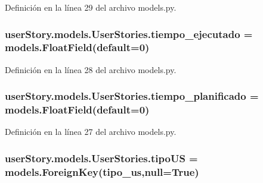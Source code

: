 Definición en la línea 29 del archivo models.\+py.

\subsubsection[{\texorpdfstring{tiempo\+\_\+ejecutado}{tiempo_ejecutado}}]{\setlength{\rightskip}{0pt plus 5cm}user\+Story.\+models.\+User\+Stories.\+tiempo\+\_\+ejecutado = models.\+Float\+Field(default=0)\hspace{0.3cm}{\ttfamily [static]}}\hypertarget{classuser_story_1_1models_1_1_user_stories_add4c9402f48f9d57b0786e27e4df58ea}{}\label{classuser_story_1_1models_1_1_user_stories_add4c9402f48f9d57b0786e27e4df58ea}


Definición en la línea 28 del archivo models.\+py.

\subsubsection[{\texorpdfstring{tiempo\+\_\+planificado}{tiempo_planificado}}]{\setlength{\rightskip}{0pt plus 5cm}user\+Story.\+models.\+User\+Stories.\+tiempo\+\_\+planificado = models.\+Float\+Field(default=0)\hspace{0.3cm}{\ttfamily [static]}}\hypertarget{classuser_story_1_1models_1_1_user_stories_a59c31c96525fb97a99df3c82ccefec49}{}\label{classuser_story_1_1models_1_1_user_stories_a59c31c96525fb97a99df3c82ccefec49}


Definición en la línea 27 del archivo models.\+py.

\subsubsection[{\texorpdfstring{tipo\+US}{tipoUS}}]{\setlength{\rightskip}{0pt plus 5cm}user\+Story.\+models.\+User\+Stories.\+tipo\+US = models.\+Foreign\+Key({\bf tipo\+\_\+us},null=True)\hspace{0.3cm}{\ttfamily [static]}}\hypertarget{classuser_story_1_1models_1_1_user_stories_aef9db53ba498c5fd769c0c6bde3f1b54}{}\label{classuser_story_1_1models_1_1_user_stories_aef9db53ba498c5fd769c0c6bde3f1b54}


